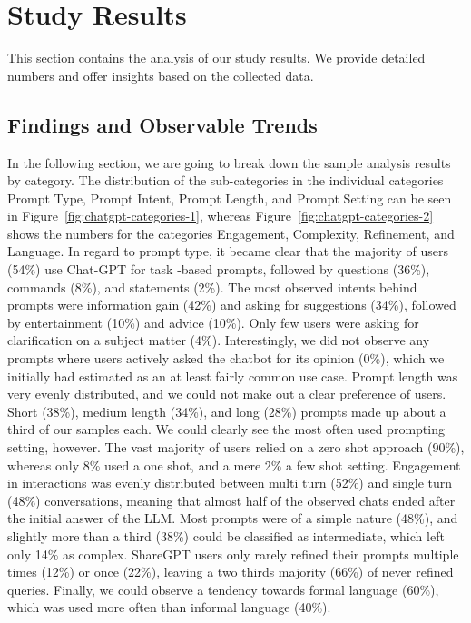 \section{Study Results}
\label{sec:study-results}
This section contains the analysis of our study results.
We provide detailed numbers and offer insights based on the collected data.
\subsection{Findings and Observable Trends}
\label{subsec:findings-and-observable-trends}
In the following section, we are going to break down the sample analysis results by category.
The distribution of the sub-categories in the individual categories Prompt Type, Prompt
Intent, Prompt Length, and Prompt Setting can be seen in Figure~\ref{fig:chatgpt-categories-1},
whereas Figure~\ref{fig:chatgpt-categories-2} shows the numbers for the categories Engagement,
Complexity, Refinement, and Language.
In regard to prompt type, it became clear that the majority of users (54\%) use Chat-GPT for task -based prompts, followed by questions (36\%), commands (8\%), and statements (2\%).
The most observed intents behind prompts were information gain (42\%) and asking for suggestions (34\%), followed by entertainment (10\%) and advice (10\%).
Only few users were asking for clarification on a subject matter (4\%).
Interestingly, we did not observe any prompts where users actively asked the chatbot for its
opinion (0\%), which we initially had estimated as an at least fairly common use case.
Prompt length was very evenly distributed, and we could not make out a clear preference of users.
Short (38\%), medium length (34\%), and long (28\%) prompts made up about a third of our samples
each.
We could clearly see the most often used prompting setting, however.
The vast majority of users relied on a zero shot approach (90\%), whereas only 8\% used a one shot,
and a mere 2\% a few shot setting.
Engagement in interactions was evenly distributed between multi turn (52\%) and single turn (48\%)
conversations, meaning that almost half of the observed chats ended after the initial answer of
the LLM\@.
Most prompts were of a simple nature (48\%), and slightly more than a third (38\%) could be
classified as intermediate, which left only 14\% as complex.
ShareGPT users only rarely refined their prompts multiple times (12\%) or once (22\%),
leaving a two thirds majority (66\%) of never refined queries.
Finally, we could observe a tendency towards formal language (60\%), which was used more often
than informal language (40\%).

